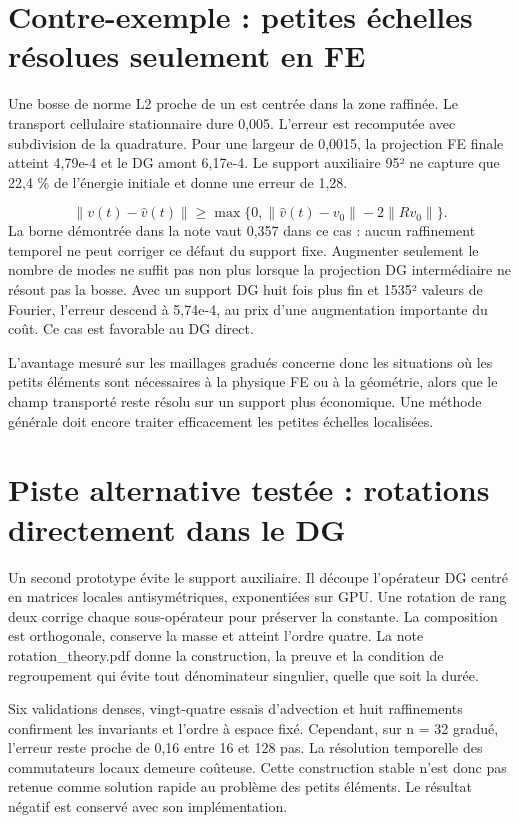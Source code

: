 \documentclass[10pt,a4paper]{article}
\begin{document}
\section{Contre-exemple : petites échelles résolues seulement en FE}
Une bosse de norme L2 proche de un est centrée dans la zone raffinée. Le transport cellulaire stationnaire dure 0,005. L'erreur est recomputée avec subdivision de la quadrature. Pour une largeur de 0,0015, la projection FE finale atteint 4,79e-4 et le DG amont 6,17e-4. Le support auxiliaire 95² ne capture que 22,4 \% de l'énergie initiale et donne une erreur de 1,28.

\[\|v(t)-\widehat v(t)\|\geq\max\{0,\|\widehat v(t)-v_0\|-2\|Rv_0\|\}.\]
La borne démontrée dans la note vaut 0,357 dans ce cas : aucun raffinement temporel ne peut corriger ce défaut du support fixe. Augmenter seulement le nombre de modes ne suffit pas non plus lorsque la projection DG intermédiaire ne résout pas la bosse. Avec un support DG huit fois plus fin et 1535² valeurs de Fourier, l'erreur descend à 5,74e-4, au prix d'une augmentation importante du coût. Ce cas est favorable au DG direct.

L'avantage mesuré sur les maillages gradués concerne donc les situations où les petits éléments sont nécessaires à la physique FE ou à la géométrie, alors que le champ transporté reste résolu sur un support plus économique. Une méthode générale doit encore traiter efficacement les petites échelles localisées.

\section{Piste alternative testée : rotations directement dans le DG}
Un second prototype évite le support auxiliaire. Il découpe l'opérateur DG centré en matrices locales antisymétriques, exponentiées sur GPU. Une rotation de rang deux corrige chaque sous-opérateur pour préserver la constante. La composition est orthogonale, conserve la masse et atteint l'ordre quatre. La note rotation\_theory.pdf donne la construction, la preuve et la condition de regroupement qui évite tout dénominateur singulier, quelle que soit la durée.

Six validations denses, vingt-quatre essais d'advection et huit raffinements confirment les invariants et l'ordre à espace fixé. Cependant, sur n = 32 gradué, l'erreur reste proche de 0,16 entre 16 et 128 pas. La résolution temporelle des commutateurs locaux demeure coûteuse. Cette construction stable n'est donc pas retenue comme solution rapide au problème des petits éléments. Le résultat négatif est conservé avec son implémentation.
\end{document}
